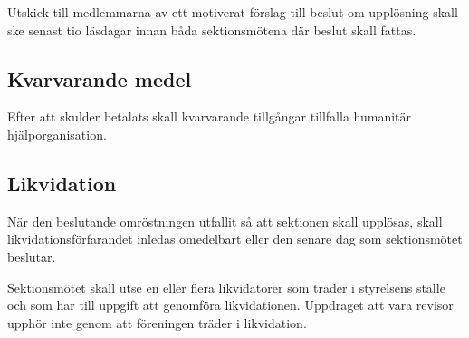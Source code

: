 \documentclass{datateknologsektionen-document}
\begin{document}
Utskick till medlemmarna av ett motiverat förslag till beslut om upplösning skall ske
senast tio läsdagar innan båda sektionsmötena där beslut skall fattas.
\subsection{Kvarvarande medel}
Efter att skulder betalats skall kvarvarande tillgångar tillfalla humanitär
hjälporganisation.
\subsection{Likvidation}
När den beslutande omröstningen utfallit så att sektionen skall upplösas, skall
likvidationsförfarandet inledas omedelbart eller den senare dag som sektionsmötet
beslutar.

Sektionsmötet skall utse en eller flera likvidatorer som träder i styrelsens ställe och som
har till uppgift att genomföra likvidationen. Uppdraget att vara revisor upphör inte genom
att föreningen träder i likvidation.
\end{document}
